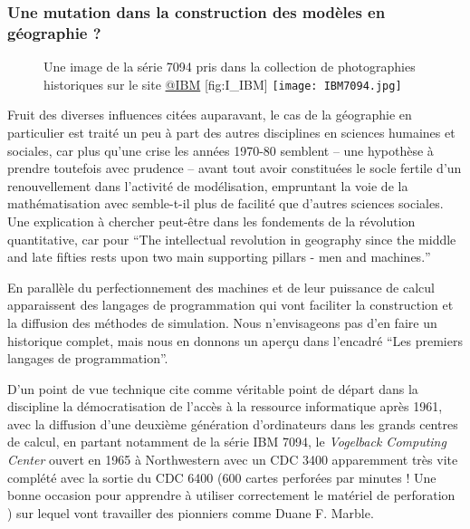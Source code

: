 \subsubsection{Une mutation dans la construction des modèles en géographie ?}
\label{ssec:crise_mutation}

\begin{figure}[htbp]
\begin{sidecaption}{Une image de la série 7094 pris dans la collection de photographies historiques sur le site \href{http://www-03.ibm.com/ibm/history/exhibits/mainframe/mainframe_album.html}{@IBM} }[fig:I_IBM]
  \centering
 \texttt{[image: IBM7094.jpg]}
  \end{sidecaption}
\end{figure}

Fruit des diverses influences citées auparavant, le cas de la géographie en particulier est traité un peu à part des autres disciplines en sciences humaines et sociales, car plus qu'une crise les années 1970-80 semblent -- une hypothèse à prendre toutefois avec prudence -- avant tout avoir constituées le socle fertile d'un renouvellement dans l'activité de modélisation, empruntant la voie de la mathématisation avec semble-t-il plus de facilité que d'autres sciences sociales. Une explication à chercher peut-être dans les fondements de la révolution quantitative, car pour \textcite{Gould1970} \foreignquote{english}{The intellectual revolution in geography since the middle and late fifties rests upon two main supporting pillars - men and machines.}

En parallèle du perfectionnement des machines et de leur puissance de calcul apparaissent des langages de programmation qui vont faciliter la construction et la diffusion des méthodes de simulation. Nous n'envisageons pas d'en faire un historique complet, mais nous en donnons un aperçu dans l'encadré \enquote{Les premiers langages de programmation}.

D'un point de vue technique \textcite{Haggett1969} cite comme véritable point de départ dans la discipline la démocratisation de l'accès à la ressource informatique après 1961, avec la diffusion d'une deuxième génération d'ordinateurs dans les grands centres de calcul, en partant notamment de la série IBM 7094, le \textit{Vogelback Computing Center} ouvert en 1965 à Northwestern avec un CDC 3400 apparemment très vite complété avec la sortie du CDC 6400 (600 cartes perforées par minutes ! Une bonne occasion pour apprendre à utiliser correctement le matériel de perforation \autocite{Fisk2005}) sur lequel vont travailler des pionniers comme Duane F. Marble.

